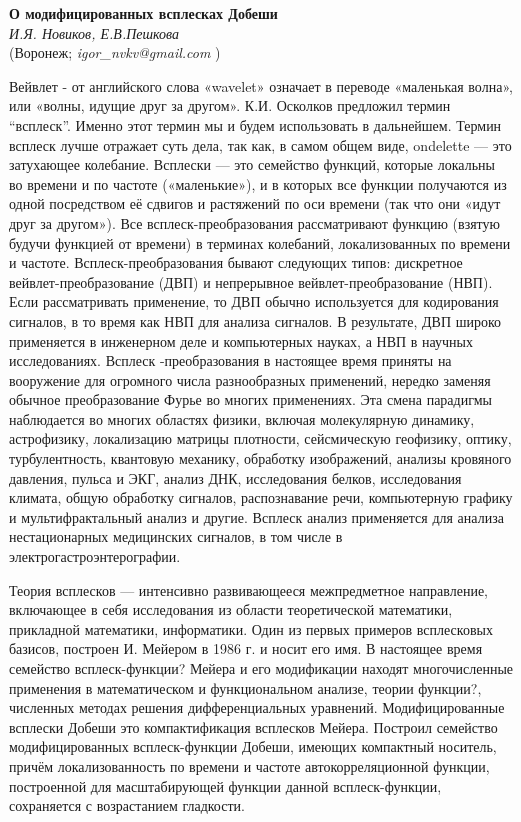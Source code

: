 
\begin{center}{ \bf О модифицированных всплесках Добеши}\\
{\it И.Я. Новиков, Е.В.Пешкова } \\
(Воронеж; {\it igor\_nvkv@gmail.com} )\\

\end{center}


Вейвлет - от английского слова «wavelet» означает в переводе «маленькая волна», или «волны, идущие друг за другом». К.И. Осколков предложил термин “всплеск”. Именно этот термин мы и будем использовать в дальнейшем. Термин всплеск лучше отражает суть дела, так как, в самом общем виде, ondelette — это затухающее колебание.
Всплески — это семейство функций, которые локальны во времени и по частоте («маленькие»), и в которых все функции получаются из одной посредством её сдвигов и растяжений по оси времени (так что они «идут друг за другом»).
Все всплеск-преобразования рассматривают функцию (взятую будучи функцией от времени) в терминах колебаний, локализованных по времени и частоте. Всплеск-преобразования бывают следующих типов: дискретное вейвлет-преобразование (ДВП) и непрерывное вейвлет-преобразование (НВП).
Если рассматривать применение, то ДВП обычно используется для кодирования сигналов, в то время как НВП для анализа сигналов. В результате, ДВП широко применяется в инженерном деле и компьютерных науках, а НВП в научных исследованиях. Всплеск -преобразования в настоящее время приняты на вооружение для огромного числа разнообразных применений, нередко заменяя обычное преобразование Фурье во многих применениях. Эта смена парадигмы наблюдается во многих областях физики, включая молекулярную динамику, астрофизику, локализацию матрицы плотности, сейсмическую геофизику, оптику, турбулентность, квантовую механику, обработку изображений, анализы кровяного давления, пульса и ЭКГ, анализ ДНК, исследования белков, исследования климата, общую обработку сигналов, распознавание речи, компьютерную графику и мультифрактальный анализ и другие. Всплеск анализ применяется для анализа нестационарных медицинских сигналов, в том числе в электрогастроэнтерографии.

Теория всплесков — интенсивно развивающееся межпредметное направление, включающее в себя исследования из области теоретической математики, прикладной математики, информатики. Один из первых примеров всплесковых базисов, построен И. Мейером в 1986 г. и носит его имя. В настоящее время семейство всплеск-функции? Мейера и его модификации находят многочисленные применения в математическом и функциональном анализе, теории функции?, численных методах решения дифференциальных уравнений.
Модифицированные всплески Добеши это компактификация всплесков Мейера.
Построил семейство модифицированных всплеск-функции Добеши, имеющих компактный носитель, причём локализованность по времени и частоте автокорреляционной функции, построенной для масштабирующей функции данной всплеск-функции, сохраняется с возрастанием гладкости.
